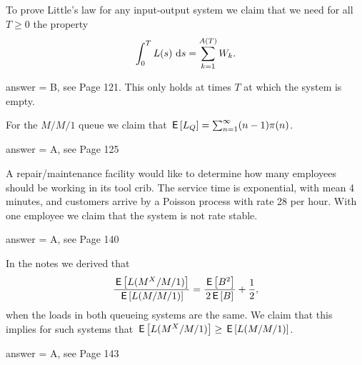 \begin{exercise}[201807]{1}
To prove Little's law for any input-output system we claim that we need for all $T\geq 0$ the property 
\begin{equation*}
  \int_0^T L(s)\, \,\text{d}s  =  \sum_{k=1}^{A(T)} W_k.
\end{equation*}
\begin{solution}
answer = B, see Page 121. This only holds at times $T$ at which the system is empty.
\end{solution}
\end{exercise}

\begin{exercise}[201807]{1}
For the $M/M/1$ queue we claim  that $\,\mathsf{E}\left[L_Q\right] = \sum_{n=1}^\infty (n-1)\pi(n)$.
\begin{solution}
answer = A, see Page 125
\end{solution}
\end{exercise}

\begin{exercise}[201807]{1}
 A repair/maintenance facility would like to determine
  how many employees should be working in its tool crib. The service
  time is exponential, with mean 4 minutes, and customers arrive by a
  Poisson process with rate 28 per hour. With one employee we claim that the system is not rate stable.
\begin{solution}
answer = A, see Page 140
\end{solution}
\end{exercise}

\begin{exercise}[201807]{1}
  In the notes we derived that
    \begin{equation*}
    \frac{\,\mathsf{E}\left[L(M^X/M/1)\right]}{\,\mathsf{E}\left[L(M/M/1)\right]} = \frac{\,\mathsf{E}\left[B^2\right]}{2\,\mathsf{E}\left[B\right]} + \frac 12,
    \end{equation*}
when the loads in both queueing systems are the same. We claim that this implies for such systems that
$\,\mathsf{E}\left[L(M^X/M/1)\right]\geq \,\mathsf{E}\left[L(M/M/1)\right]$.
\begin{solution}
answer = A, see Page 143
\end{solution}
\end{exercise}


